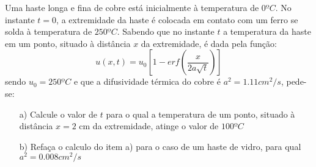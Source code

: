 \linespread{1.5}

Uma haste longa e fina de cobre está inicialmente à temperatura de $0ºC$. No instante $t=0$, a extremidade da haste é colocada em contato com um ferro se solda à temperatura de $250ºC$. Sabendo que no instante $t$ a temperatura da haste em um ponto, situado à distância $x$ da extremidade, é dada pela função:
\begin{equation*}
    u(x,t) = u_0\left[1-erf\left(\frac{x}{2a\sqrt{t}}\right)\right]
\end{equation*}
sendo $u_0 = 250ºC$ e que a difusividade térmica do cobre é $a^2 = 1.11cm^2/s$, pede-se:
\begin{itemize}
    \item[a)]Calcule o valor de $t$ para o qual a temperatura de um ponto, situado à distância $x=2$ cm da extremidade, atinge o valor de $100ºC$
    \item[b)] Refaça o calculo do item a) para o caso de um haste de vidro, para qual $a^2 = 0.008 cm^2/s$
\end{itemize}